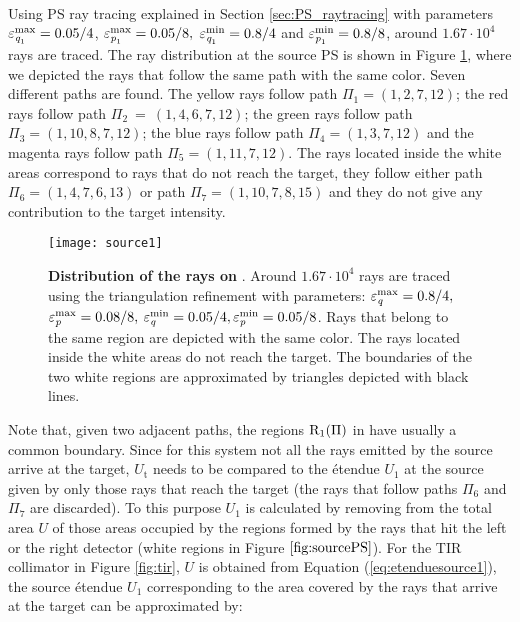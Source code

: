 \\ \indent
Using PS ray tracing explained in Section \ref{sec:PS_raytracing} with parameters $\varepsilon_{\textit{q}_1}^{\textrm{max}} = 0.05/4$, $ \varepsilon_{\textit{p}_1}^\textrm{max} = 0.05/8, $ $\varepsilon_{\textit{q}_1}^\textrm{min} = 0.8/4$ and $\varepsilon_{\textit{p}_1}^\textrm{min} = 0.8/8$, around $1.67 \cdot 10^4$ rays are traced. The ray distribution at the source PS  is shown in Figure \ref{fig:sourcePS}, where we depicted the rays that follow the same path with the same color. Seven different paths are found. The yellow rays follow path $\Pi_1 = (1, 2, 7, 12)$;
   the red rays follow path $\Pi_2 ~= ~(1, 4, 6, 7, 12)$; the green rays follow path $\Pi_3 = (1, 10, 8, 7, 12)$;
   the blue rays follow path $\Pi_4= (1, 3, 7, 12)$ and the magenta rays follow path $\Pi_5= (1, 11, 7, 12)$. The rays located inside the white areas correspond to rays that do not reach the target, they follow either path $\Pi_6 = (1, 4, 7, 6, 13)$ or path $\Pi_7 = (1,10,7,8,15)$ and they do not give any contribution to the target intensity.
\begin{figure}[t]
\label{fig:sourcePS}
  \begin{center}
  \texttt{[image: source1]}
  \end{center}
  \caption{\textbf{Distribution of the rays on }. Around $1.67 \cdot 10^4$ rays are traced using the triangulation refinement with parameters:
  $\varepsilon_{\textit{q}}^\textrm{max} = 0.8/4 ,$ $ \varepsilon_{\textit{p}}^\textrm{max} = 0.08/8, $ $\varepsilon_{\textit{q}}^\textrm{min} = 0.05/4, \varepsilon_{\textit{p}}^\textrm{min} = 0.05/8$. Rays that belong to the same region are depicted with the same color. The rays located inside the white areas do not reach the target. The boundaries of the two white regions are approximated by triangles depicted with black lines.}
 \label{fig:sourcePS}
\end{figure}
Note that, given two adjacent paths, the regions $\mbox{$\textup{R}_{\textit{$1$}}$}(\Pi)$ in  have usually a common boundary. 
Since for this system not all the rays emitted by the source arrive at the target, $U_{\textrm{t}}$ needs to be compared to the \'{e}tendue $U_1$ at the source given by only those rays that reach the target (the rays that follow paths $\Pi_6$ and 
$\Pi_7$ are discarded). To this purpose $U_1$ is calculated by removing from the total area $U$ of  those areas occupied by the regions formed by the rays that hit the left or the right detector (white regions in Figure $\ref{fig:sourcePS}$).  For the TIR collimator in Figure \ref{fig:tir}, $U$ is obtained from Equation (\ref{eq:etenduesource1}), the source \'{e}tendue $U_1$ corresponding to the area covered by the rays that arrive at the target can be approximated by:
